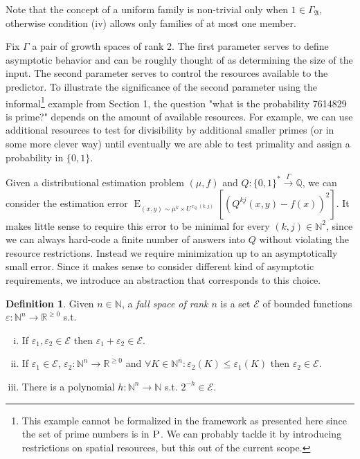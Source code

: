 \documentclass{article}
\numberwithin{equation}{section}
\theoremstyle{definition}
\newtheorem{definition}{Definition}[section]
\theoremstyle{plain}
\newcommand{\Words}{{\{ 0, 1 \}^*}}
\DeclareMathOperator{\E}{E}
\DeclareMathOperator{\R}{r}
\newcommand{\Nats}{\mathbb{N}}
\newcommand{\Rats}{\mathbb{Q}}
\newcommand{\Reals}{\mathbb{R}}
\begin{document}
Note that the concept of a uniform family is non-trivial only when $1 \in \Gamma_{\mathfrak{A}}$, otherwise condition (iv) allows only families of at most one member.

Fix $\Gamma$ a pair of growth spaces of rank 2. The first parameter serves to define asymptotic behavior and can be roughly thought of as determining the size of the input. The second parameter serves to control the resources available to the predictor. To illustrate the significance of the second parameter using the informal\footnote{This example cannot be formalized in the framework as presented here since the set of prime numbers is in $\textsc{P}$. We can probably tackle it by introducing restrictions on spatial resources, but this out of the current scope.} example from Section 1, the question "what is the probability 7614829 is prime?" depends on the amount of available resources. For example, we can use additional resources to test for divisibility by additional smaller primes (or in some more clever way) until eventually we are able to test primality and assign a probability in $\{0,1\}$.

Given a distributional estimation problem $(\mu,f)$ and $Q: \Words \xrightarrow{\Gamma} \Rats$, we can consider the estimation error $\E_{(x,y) \sim \mu^k \times U^{\R_Q(k,j)}}[(Q^{kj}(x,y) - f(x))^2]$. It makes little sense to require this error to be minimal for every $(k,j) \in \Nats^2$, since we can always hard-code a finite number of answers into $Q$ without violating the resource restrictions. Instead we require minimization up to an asymptotically small error. Since it makes sense to consider different kind of asymptotic requirements, we introduce an abstraction that corresponds to this choice.

\begin{definition}

Given $n \in \Nats$, a \emph{fall space of rank $n$} is a set $\mathcal{E}$ of bounded functions $\varepsilon: \Nats^n \rightarrow \Reals^{\geq 0}$ s.t.

\begin{enumerate}[(i)]

\item If $\varepsilon_1, \varepsilon_2 \in \mathcal{E}$ then $\varepsilon_1 + \varepsilon_2 \in \mathcal{E}$.

\item If $\varepsilon_1 \in \mathcal{E}$, $\varepsilon_2: \Nats^n \rightarrow \Reals^{\geq 0}$ and $\forall K \in \Nats^n: \varepsilon_2(K) \leq \varepsilon_1(K)$ then $\varepsilon_2 \in \mathcal{E}$.

\item There is a polynomial $h: \Nats^n \rightarrow \Nats$ s.t. $2^{-h} \in \mathcal{E}$.

\end{enumerate}

\end{definition}
\end{document}
